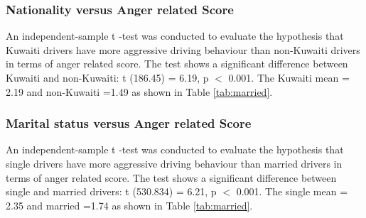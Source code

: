 \documentclass[preprint,12pt,a4paper,authoryear]{elsarticle}
\begin{document}
\begin{linenumbers}
\subsubsection{Nationality versus Anger related Score}

An independent-sample t -test was conducted to evaluate the hypothesis that Kuwaiti drivers have more aggressive driving behaviour than non-Kuwaiti drivers in terms of anger related score. The test shows a significant difference between Kuwaiti and non-Kuwaiti: t (186.45) = 6.19, p $<$ 0.001. The Kuwaiti mean = 2.19 and non-Kuwaiti =1.49 as shown in Table \ref{tab:married}.

\subsubsection{Marital status versus Anger related Score}

An independent-sample t -test was conducted to evaluate the hypothesis that single drivers have more aggressive driving behaviour than married  drivers in terms of anger related score. The test shows a significant difference between single and married drivers: t (530.834) = 6.21, p $<$ 0.001. The single mean = 2.35 and married =1.74 as shown in Table \ref{tab:married}.

\begin{table}[H]
\centering
\caption{Tests on married and anger}
\label{tab:married}
\end{table}


\end{linenumbers}
\end{document}

